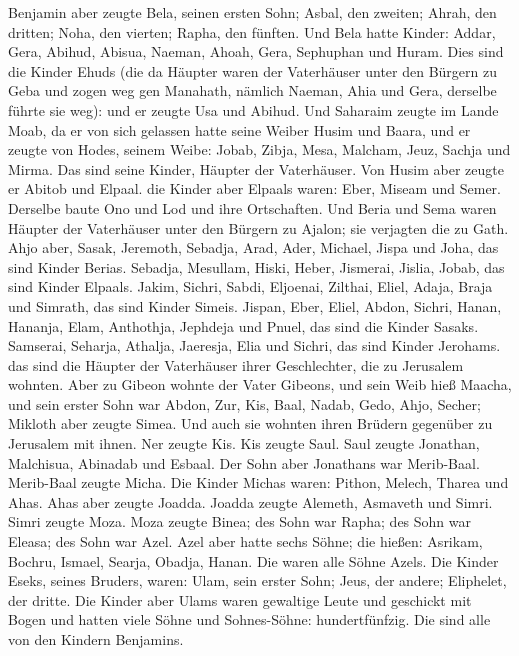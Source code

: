  Benjamin aber zeugte Bela, seinen ersten Sohn; Asbal, den
zweiten; Ahrah, den dritten;  Noha, den vierten; Rapha, den
fünften.  Und Bela hatte Kinder: Addar, Gera, Abihud,
 Abisua, Naeman, Ahoah,  Gera, Sephuphan und
Huram.  Dies sind die Kinder Ehuds (die da Häupter waren der
Vaterhäuser unter den Bürgern zu Geba und zogen weg gen Manahath,
 nämlich Naeman, Ahia und Gera, derselbe führte sie weg):
und er zeugte Usa und Abihud.  Und Saharaim zeugte im Lande
Moab, da er von sich gelassen hatte seine Weiber Husim und Baara,
 und er zeugte von Hodes, seinem Weibe: Jobab, Zibja, Mesa,
Malcham,  Jeuz, Sachja und Mirma. Das sind seine Kinder,
Häupter der Vaterhäuser.  Von Husim aber zeugte er Abitob
und Elpaal.  die Kinder aber Elpaals waren: Eber, Miseam
und Semer. Derselbe baute Ono und Lod und ihre Ortschaften.
 Und Beria und Sema waren Häupter der Vaterhäuser unter den
Bürgern zu Ajalon; sie verjagten die zu Gath.  Ahjo aber,
Sasak, Jeremoth,  Sebadja, Arad, Ader, 
Michael, Jispa und Joha, das sind Kinder Berias.  Sebadja,
Mesullam, Hiski, Heber,  Jismerai, Jislia, Jobab, das sind
Kinder Elpaals.  Jakim, Sichri, Sabdi, 
Eljoenai, Zilthai, Eliel,  Adaja, Braja und Simrath, das
sind Kinder Simeis.  Jispan, Eber, Eliel, 
Abdon, Sichri, Hanan,  Hananja, Elam, Anthothja,
 Jephdeja und Pnuel, das sind die Kinder Sasaks.
 Samserai, Seharja, Athalja,  Jaeresja, Elia
und Sichri, das sind Kinder Jerohams.  das sind die Häupter
der Vaterhäuser ihrer Geschlechter, die zu Jerusalem wohnten.
 Aber zu Gibeon wohnte der Vater Gibeons, und sein Weib
hieß Maacha,  und sein erster Sohn war Abdon, Zur, Kis,
Baal, Nadab,  Gedo, Ahjo, Secher;  Mikloth
aber zeugte Simea. Und auch sie wohnten ihren Brüdern gegenüber zu
Jerusalem mit ihnen.  Ner zeugte Kis. Kis zeugte Saul. Saul
zeugte Jonathan, Malchisua, Abinadab und Esbaal.  Der Sohn
aber Jonathans war Merib-Baal. Merib-Baal zeugte Micha. 
Die Kinder Michas waren: Pithon, Melech, Tharea und Ahas. 
Ahas aber zeugte Joadda. Joadda zeugte Alemeth, Asmaveth und Simri.
Simri zeugte Moza.  Moza zeugte Binea; des Sohn war Rapha;
des Sohn war Eleasa; des Sohn war Azel.  Azel aber hatte
sechs Söhne; die hießen: Asrikam, Bochru, Ismael, Searja, Obadja, Hanan.
Die waren alle Söhne Azels.  Die Kinder Eseks, seines
Bruders, waren: Ulam, sein erster Sohn; Jeus, der andere; Eliphelet, der
dritte.  Die Kinder aber Ulams waren gewaltige Leute und
geschickt mit Bogen und hatten viele Söhne und Sohnes-Söhne:
hundertfünfzig. Die sind alle von den Kindern Benjamins.

